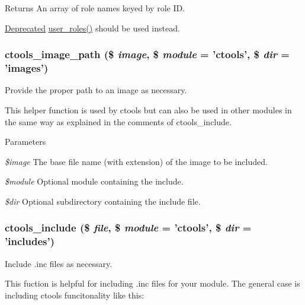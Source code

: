 \begin{DoxyReturn}{Returns}
An array of role names keyed by role ID.
\end{DoxyReturn}
\begin{Desc}
\item[\hyperlink{deprecated__deprecated000005}{Deprecated}]\hyperlink{user_8module_a2c97e1595e6af351e0ab7d60da180017}{user\_\-roles()} should be used instead. \end{Desc}
\hypertarget{ctools_8module_a8c2a362e0904c9014ef0bb33961cbd09}{
\subsubsection[{ctools\_\-image\_\-path}]{\setlength{\rightskip}{0pt plus 5cm}ctools\_\-image\_\-path (\$ {\em image}, \/  \$ {\em module} = {\ttfamily 'ctools'}, \/  \$ {\em dir} = {\ttfamily 'images'})}}
\label{ctools_8module_a8c2a362e0904c9014ef0bb33961cbd09}
Provide the proper path to an image as necessary.

This helper function is used by ctools but can also be used in other modules in the same way as explained in the comments of ctools\_\-include.


\begin{DoxyParams}{Parameters}
\item[{\em \$image}]The base file name (with extension) of the image to be included. \item[{\em \$module}]Optional module containing the include. \item[{\em \$dir}]Optional subdirectory containing the include file. \end{DoxyParams}
\hypertarget{ctools_8module_aab220ed5e60234f37c77bedbdb8a4905}{
\subsubsection[{ctools\_\-include}]{\setlength{\rightskip}{0pt plus 5cm}ctools\_\-include (\$ {\em file}, \/  \$ {\em module} = {\ttfamily 'ctools'}, \/  \$ {\em dir} = {\ttfamily 'includes'})}}
\label{ctools_8module_aab220ed5e60234f37c77bedbdb8a4905}
Include .inc files as necessary.

This fuction is helpful for including .inc files for your module. The general case is including ctools funcitonality like this:



